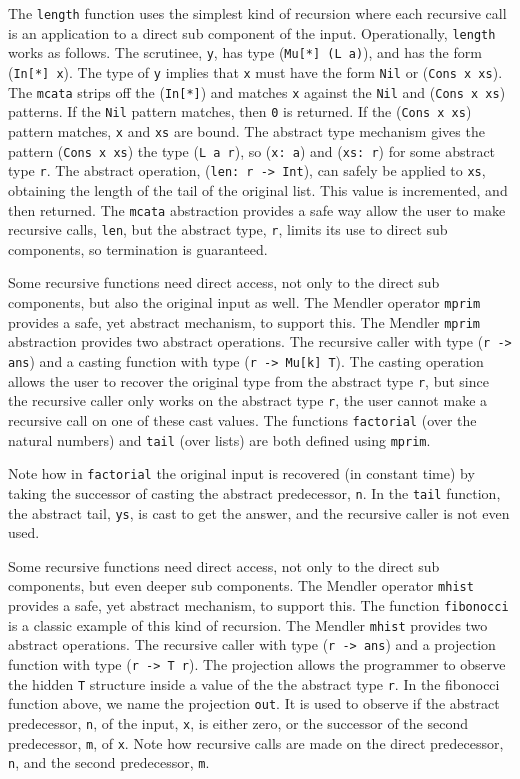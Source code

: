 The \verb+length+ function uses the simplest kind of recursion where
each recursive call is an application to a direct sub component of the input.
Operationally, \verb+length+ works as follows. The scrutinee, \verb+y+,
has type (\verb+Mu[*] (L a)+), and has the form (\verb+In[*] x+). 
The type of \verb+y+ implies that \verb+x+ must have the form \verb+Nil+ or
(\verb+Cons x xs+).  The  \verb+mcata+ strips off the (\verb+In[*]+) and matches \verb+x+ against
the \verb+Nil+ and (\verb+Cons x xs+) patterns. If the \verb+Nil+ pattern
matches, then \verb+0+ is returned. If the (\verb+Cons x xs+) pattern matches,
\verb+x+ and \verb+xs+ are bound. The abstract type mechanism gives the
pattern (\verb+Cons x xs+) the type (\verb+L a r+), so (\verb+x: a+) and
(\verb+xs: r+) for some abstract type \verb+r+. The abstract operation,
(\verb+len: r -> Int+), can safely be applied to \verb+xs+,
obtaining the length of the tail of the original list. This value
is incremented, and then returned. The \verb+mcata+ abstraction provides a safe way
allow the user to make recursive calls, \verb+len+, but the abstract type, \verb+r+,
limits its use to direct sub components, so termination is guaranteed.

Some recursive functions need direct access, not only to the direct sub components,
but also the original input as well. The Mendler operator \verb+mprim+ provides
a safe, yet abstract mechanism, to support this. The Mendler \verb+mprim+
abstraction provides two abstract operations. The recursive caller with type
(\verb+r -> ans+) and a casting function with type (\verb+r -> Mu[k] T+). The
casting operation allows the user to recover the original type from the abstract
type \verb+r+, but since the recursive caller
only works on the abstract type \verb+r+, the user cannot make a recursive call
on one of these cast values. The functions
\verb+factorial+ (over the natural numbers) and \verb+tail+ (over lists) are both
defined using \verb+mprim+.

Note how in \verb+factorial+ the original input is recovered (in constant time)
by taking the successor of casting the abstract predecessor, \verb+n+. In the
\verb+tail+ function, the abstract tail, \verb+ys+, is cast to get the
answer, and the recursive caller is not even used.

Some recursive functions need direct access, not only to the direct sub components,
but even deeper sub components. The Mendler operator \verb+mhist+ provides
a safe, yet abstract mechanism, to support this. The function \verb+fibonocci+
is a classic example of this kind of recursion.  The Mendler \verb+mhist+
provides two abstract operations. The recursive caller with type
(\verb+r -> ans+) and a projection function with type (\verb+r -> T r+). The projection
allows the programmer to observe the hidden \verb+T+ structure inside a value
of the the abstract type \verb+r+.
In the fibonocci function above, we name the projection \verb+out+. It is used
to observe if the abstract predecessor, \verb+n+, of the input, \verb+x+, is either
zero, or the successor of the second predecessor, \verb+m+, of \verb+x+. Note
how recursive calls are made on the direct predecessor, \verb+n+, and the second  predecessor,
\verb+m+.

